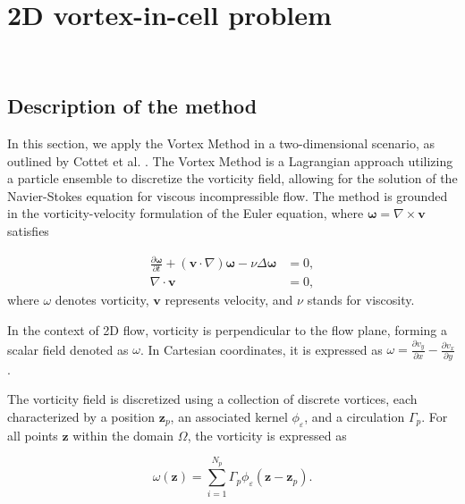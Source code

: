 
\section{2D vortex-in-cell problem}~\label{App_2D}

\subsection{Description of the method}

In this section, we apply the Vortex Method in a two-dimensional scenario, as outlined by Cottet et al. \cite{cottet_vortex_2000}. The Vortex Method is a Lagrangian approach utilizing a particle ensemble to discretize the vorticity field, allowing for the solution of the Navier-Stokes equation for viscous incompressible flow. The method is grounded in the vorticity-velocity formulation of the Euler equation, where $\bm \omega = \nabla \times \bm{v}$ satisfies

\[
    \begin{aligned}
        \frac{\partial \bm \omega}{\partial t} + (\bm{v} \cdot \nabla) \bm \omega - \nu \Delta \bm \omega & = 0, \\
        \nabla \cdot \bm v                                                                                & = 0,
    \end{aligned}
\]where $\omega$ denotes vorticity, $\bm{v}$ represents velocity, and $\nu$ stands for viscosity.

In the context of 2D flow, vorticity is perpendicular to the flow plane, forming a scalar field denoted as $\omega$. In Cartesian coordinates, it is expressed as $\omega = \frac{\partial v_y}{\partial x} - \frac{\partial v_x}{\partial y}$.

The vorticity field is discretized using a collection of discrete vortices, each characterized by a position $\bm z_p$, an associated kernel $\phi_\varepsilon$, and a circulation $\Gamma_p$. For all points $\bm z$ within the domain $\Omega$, the vorticity is expressed as

\begin{equation*}
    \omega(\bm z) = \sum_{i=1}^{N_p} \Gamma_p \phi_\varepsilon(\bm z - \bm z_p).
\end{equation*}

